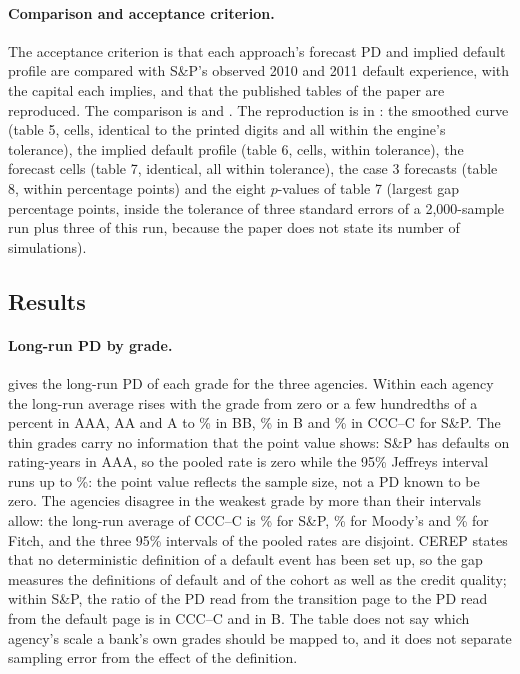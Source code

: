 \paragraph{Comparison and acceptance criterion.} The acceptance criterion is that each approach's forecast PD and implied default profile are compared with S\&P's observed 2010 and 2011 default experience, with the capital each implies, and that the published tables of the paper are reproduced. The comparison is  and . The reproduction is in : the smoothed curve (table 5, \rtgGoldFiveN{} cells, \rtgGoldFiveIdent{} identical to the printed digits and all within the engine's tolerance), the implied default profile (table 6, \rtgGoldSixN{} cells, \rtgGoldSixOk{} within tolerance), the \rtgGoldSevenN{} forecast cells (table 7, \rtgGoldSevenIdent{} identical, all within tolerance), the case 3 forecasts (table 8, within \rtgGoldEightMax{} percentage points) and the eight $p$-values of table 7 (largest gap \rtgGoldSevenpMax{} percentage points, inside the tolerance of three standard errors of a 2,000-sample run plus three of this run, because the paper does not state its number of simulations).

\subsection{Results}
\label{sec:results-ratings}

\paragraph{Long-run PD by grade.}  gives the long-run PD of each grade for the three agencies. Within each agency the long-run average rises with the grade from zero or a few hundredths of a percent in AAA, AA and A to \rtgLraSpBB{}\% in BB, \rtgLraSpB{}\% in B and \rtgLraSpCCCC{}\% in CCC--C for S\&P. The thin grades carry no information that the point value shows: S\&P has \rtgLradSpAAA{} defaults on \rtgLranSpAAA{} rating-years in AAA, so the pooled rate is zero while the 95\% Jeffreys interval runs up to \rtgJeffupSpAAA{}\%: the point value reflects the sample size, not a PD known to be zero. The agencies disagree in the weakest grade by more than their intervals allow: the long-run average of CCC--C is \rtgLraSpCCCC{}\% for S\&P, \rtgLraMoodysCCCC{}\% for Moody's and \rtgLraFitchCCCC{}\% for Fitch, and the three 95\% intervals of the pooled rates are disjoint. CEREP states that no deterministic definition of a default event has been set up, so the gap measures the definitions of default and of the cohort as well as the credit quality; within S\&P, the ratio of the PD read from the transition page to the PD read from the default page is \rtgGapDfourCCCC{} in CCC--C and \rtgGapDfourB{} in B. The table does not say which agency's scale a bank's own grades should be mapped to, and it does not separate sampling error from the effect of the definition.

